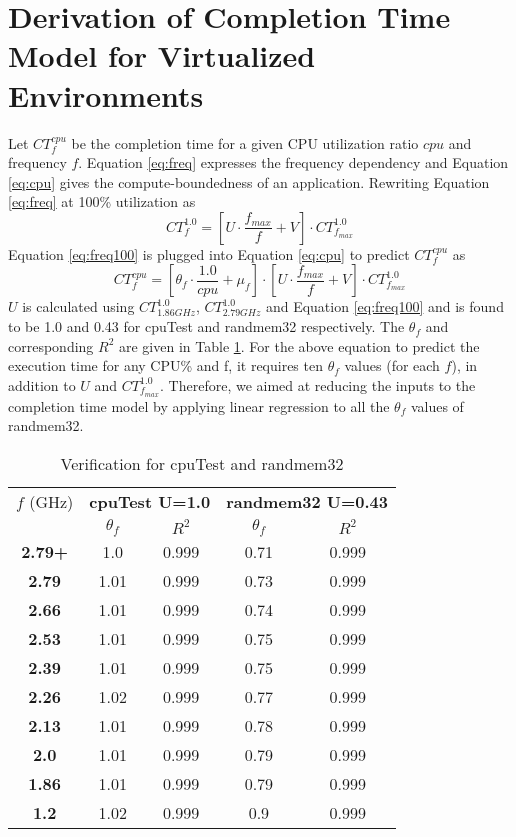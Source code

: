 \documentclass{sig-alternate}
\begin{document}
\section{Derivation of Completion Time Model for Virtualized Environments}
\label{sec:PfModelDer}
Let $CT^{cpu}_f$ be the completion time for a given CPU utilization ratio $cpu$ and frequency $f$. Equation \ref{eq:freq} expresses the frequency dependency and Equation \ref{eq:cpu} gives the compute-boundedness of an application. Rewriting Equation \ref{eq:freq} at 100\% utilization as \begin{equation}
\label{eq:freq100}
CT^{1.0}_f = [ U \cdot \frac{f_{max}}{f} + V ] \cdot CT^{1.0}_{f_{max}}
\end{equation}
Equation \ref{eq:freq100} is plugged into Equation \ref{eq:cpu} to predict $CT^{cpu}_f$ as \begin{equation}
 \label{eq:timeEq}
 CT^{cpu}_{f} = [ \theta _{f}\cdot \frac{1.0}{cpu} + \mu _{f} ] \cdot [ U \cdot \frac{f_{max}}{f} + V ] \cdot CT^{1.0}_{f_{max}}
\end{equation}
$U$ is calculated using $CT^{1.0}_{1.86GHz}$, $CT^{1.0}_{2.79GHz}$ and Equation \ref{eq:freq100} and is found to be 1.0 and 0.43 for cpuTest and randmem32 respectively. The $\theta_f$ and corresponding $R^2$ are given in Table \ref{ctcpu}. For the above equation to predict the execution time for any CPU\% and f, it requires ten $\theta_f$ values (for each $f$), in addition to $U$ and $CT^{1.0}_{f_{max}}$. Therefore, we aimed at reducing the inputs to the completion time model by applying linear regression to all the $\theta_f$ values of randmem32. 
\begin{table}[!htbp]	
\vspace{-0.5cm}
\caption{Verification for cpuTest and randmem32}
\begin{center}
\begin{tabular}{|c|c|c||c|c|}
\hline
$f$ (GHz) & \multicolumn{2}{c||}{\textbf{cpuTest U=1.0}} & \multicolumn{2}{c|}{\textbf{randmem32 U=0.43}} \\ \cline{2-5}
& $\theta_f$ & $R^2$ & $\theta_f$ & $R^2$ \\ \hline 
\textbf{2.79+}	&	1.0	&	0.999	&	0.71	&	0.999	\\	\hline
\textbf{2.79}	&	1.01	&	0.999	&	0.73	&	0.999	\\	\hline
\textbf{2.66}	&	1.01	&	0.999	&	0.74	&	0.999	\\	\hline
\textbf{2.53}	&	1.01	&	0.999	&	0.75	&	0.999	\\	\hline
\textbf{2.39}	&	1.01	&	0.999	&	0.75	&	0.999	\\	\hline
\textbf{2.26}	&	1.02	&	0.999	&	0.77	&	0.999	\\	\hline
\textbf{2.13}	&	1.01	&	0.999	&	0.78	&	0.999	\\	\hline
\textbf{2.0}	&	1.01	&	0.999	&	0.79	&	0.999	\\	\hline
\textbf{1.86}	&	1.01	&	0.999	&	0.79	&	0.999	\\	\hline
\textbf{1.2}	&	1.02	&	0.999	&	0.9	&	0.999	\\	\hline
\end{tabular}
\label{ctcpu}
\end{center}
\vspace{-0.5cm}
\end{table}
\end{document}
